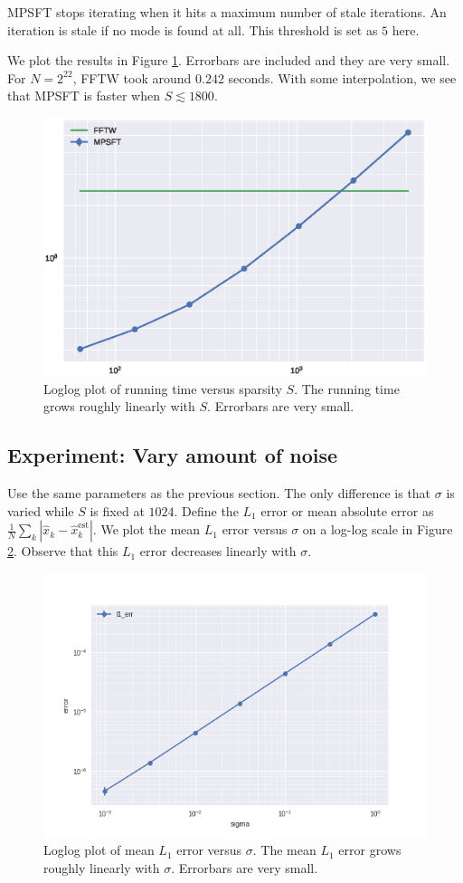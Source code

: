 \documentclass[10pt]{article}
\begin{document}
MPSFT stops iterating when it hits a maximum number of stale iterations. An iteration is stale if no mode is found at all. This threshold is set as $5$ here.

We plot the results in Figure \ref{fig:runtime}. Errorbars are included and they are very small. For $N=2^{22}$, FFTW took around $0.242$ seconds. With some interpolation, we see that MPSFT is faster when $S\lesssim 1800$.


\begin{figure}
\centering
\includegraphics[scale=0.6]{./graph/runtime}
\caption{Loglog plot of running time versus sparsity $S$. The running time grows roughly linearly with $S$. Errorbars are very small. \label{fig:runtime}}
\end{figure}


\subsection{Experiment: Vary amount of noise}

Use the same parameters as the previous section. The only difference is that $\sigma$ is varied while $S$ is fixed at $1024$. Define the $L_1$ error or mean absolute error as $\frac{1}{N}\sum_k |\hat{x}_k - \hat{x}^{\text{est}}_k|$. We plot the mean $L_1$ error versus $\sigma$ on a log-log scale in Figure \ref{fig:noise}. Observe that this $L_1$ error decreases linearly with $\sigma$.

\begin{figure}
\centering
\includegraphics[scale=0.6]{./graph/noise}
\caption{Loglog plot of mean $L_1$ error versus $\sigma$. The mean $L_1$ error grows roughly linearly with $\sigma$. Errorbars are very small. \label{fig:noise}}
\end{figure}



\end{document}

